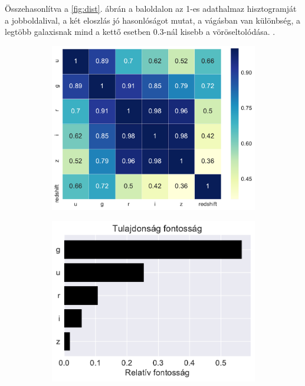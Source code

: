 \documentclass[12pt,letterpaper,twoside,openright]{book}
\begin{document}
 Összehasonlítva a \ref{fig:dist}. ábrán a baloldalon az 1-es adathalmaz hisztogramját a jobboldalival, a két eloszlás jó hasonlóságot mutat, a vágásban van különbség, a legtöbb galaxisnak mind a kettő esetben 0.3-nál kisebb a vöröseltolódása. .

 \begin{figure}[]
 \centering
  \begin{subfigure}[b]{0.32\textwidth}
    \includegraphics[width=\textwidth, height = \textwidth]{Figures/corrmap.pdf}
    \label{fig:1}
  \end{subfigure}
  \hspace{0cm}
  \begin{subfigure}[b]{0.32\textwidth}
    \includegraphics[width=\textwidth, height = \textwidth]{Figures/relf.pdf}

\end{subfigure}
\end{figure}
\end{document}
